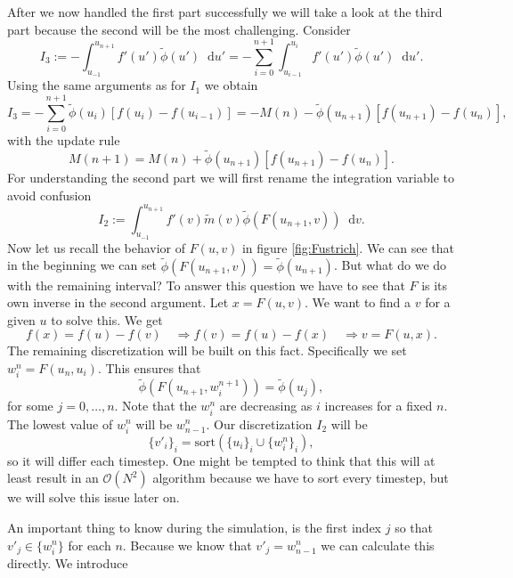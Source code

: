 \documentclass[12pt,a4paper,twoside, open=right]{scrreprt}
\theoremstyle{definition}
\theoremstyle{plain}
\newcommand{\D}{\mathop{}\!\mathrm{d}}
\begin{document}
\par After we now handled the first part successfully we will take a look at the third part because the second will be the most challenging. Consider
\begin{equation}
    I_3:=-\int_{u_{-1}}^{u_{n+1}}f'(u')\tilde\phi(u')\D u' = -\sum_{i=0}^{n+1}\int_{u_{i-1}}^{u_i}f'(u')\tilde\phi(u')\D u'.
\end{equation} Using the same arguments as for $I_1$ we obtain
\begin{equation}
    I_3 = -\sum_{i=0}^{n+1}\tilde\phi(u_i)[f(u_i)-f(u_{i-1})] = -M(n) -\tilde\phi(u_{n+1})[f(u_{n+1})-f(u_{n})],
\end{equation}
with the update rule 
\begin{equation}
    M(n+1) = M(n) + \tilde\phi(u_{n+1})[f(u_{n+1})-f(u_{n})].
\end{equation}
For understanding the second part we will first rename the integration variable to avoid confusion
\begin{equation}
    I_2:=\int_{u_{-1}}^{u_{n+1}}f'(v)\tilde{m}(v)\tilde{\phi}(F(u_{n+1},v))\D v.
\end{equation}
Now let us recall the behavior of $F(u,v)$ in figure \ref{fig:Fustrich}. We can see that in the beginning we can set $\tilde\phi(F(u_{n+1},v))=\tilde\phi(u_{n+1})$. But what do we do with the remaining interval? To answer this question we have to see that $F$ is its own inverse in the second argument. Let $x = F(u,v)$. We want to find a $v$ for a given $u$ to solve this. We get
\begin{equation}
    f(x)=f(u)-f(v)\quad\Rightarrow f(v)=f(u)-f(x)\quad\Rightarrow v= F(u,x).
\end{equation}
The remaining discretization will be built on this fact. Specifically we set $w_i^n=F(u_n,u_i)$. This ensures that 
\begin{equation}
    \tilde\phi(F(u_{n+1},w^{n+1}_i))=\tilde{\phi}(u_j),
\end{equation}
for some $j=0,\dotsc,n$. Note that the $w_i^n$ are decreasing as $i$ increases for a fixed $n$. The lowest value of $w_i^n$ will be $w_{n-1}^n$. Our discretization $I_2$ will be 
\begin{equation}
    \{v'_i\}_i=\text{sort}(\{u_i\}_i\cup \{w_i^n\}_i),
\end{equation}
so it will differ each timestep. One might be tempted to think that this will at least result in an $\mathcal{O}(N^2)$ algorithm because we have to sort every timestep, but we will solve this issue later on.
\par An important thing to know during the simulation, is the first index $j$ so that $v'_j\in\{w_i^n\}$ for each $n$. Because we know that $v'_j = w_{n-1}^n$ we can calculate this directly. We introduce 
\end{document}
